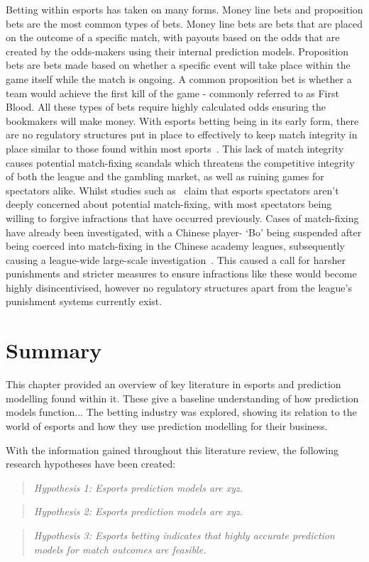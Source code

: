 Betting within esports has taken on many forms.
Money line bets and proposition bets are the most common types of bets.
Money line bets are bets that are placed on the outcome of a specific match, with payouts based on the odds that are created by the odds-makers using their internal prediction models.
Proposition bets are bets made based on whether a specific event will take place within the game itself while the match is ongoing.
A common proposition bet is whether a team would achieve the first kill of the game - commonly referred to as First Blood.
All these types of bets require highly calculated odds ensuring the bookmakers will make money.
With esports betting being in its early form, there are no regulatory structures put in place to effectively to keep match integrity in place similar to those found within most sports~\citep{dos2017q}.
This lack of match integrity causes potential match-fixing scandals which threatens the competitive integrity of both the league and the gambling market, as well as ruining games for spectators alike.
Whilst studies such as~\citet{abarbanel2019esports} claim that esports spectators aren't deeply concerned about potential match-fixing, with most spectators being willing to forgive infractions that have occurred previously.
Cases of match-fixing have already been investigated, with a Chinese player- `Bo' being suspended after being coerced into match-fixing in the Chinese academy leagues, subsequently causing a league-wide large-scale investigation~\citep{heath2021matchfixing}.
This caused a call for harsher punishments and stricter measures to ensure infractions like these would become highly disincentivised, however no regulatory structures apart from the league's punishment systems currently exist.\\



\section{Summary}\label{sec:Summary}
This chapter provided an overview of key literature in esports and prediction modelling found within it.
These give a baseline understanding of how prediction models function...
The betting industry was explored, showing its relation to the world of esports and how they use prediction modelling for their business.

With the information gained throughout this literature review, the following research hypotheses have been created:

\begin{quote}  \emph{Hypothesis 1: Esports prediction models are xyz.} \end{quote}

\begin{quote}  \emph{Hypothesis 2: Esports prediction models are xyz.} \end{quote}

\begin{quote}  \emph{Hypothesis 3: Esports betting indicates that highly accurate prediction models for match outcomes are feasible.} \end{quote}